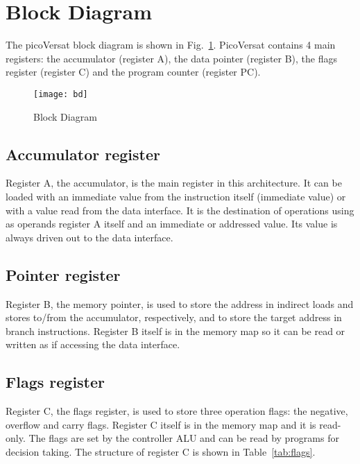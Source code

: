 \section{Block Diagram}

The picoVersat block diagram is shown in Fig.~\ref{fig:bd}. PicoVersat contains
4 main registers: the accumulator (register A), the data pointer (register B),
the flags register (register C) and the program counter (register PC).

\begin{figure}[!htbp]
    \centerline{\texttt{[image: bd]}}
    \vspace{0cm}\caption{Block Diagram}
    \label{fig:bd}
\end{figure}



\subsection{Accumulator register}

Register A, the accumulator, is the main register in this architecture. It can
be loaded with an immediate value from the instruction itself (immediate value)
or with a value read from the data interface. It is the destination of
operations using as operands register A itself and an immediate or addressed
value. Its value is always driven out to the data interface.

\subsection{Pointer register}

Register B, the memory pointer, is used to store the address in indirect loads
and stores to/from the accumulator, respectively, and to store the target
address in branch instructions. Register B itself is in the memory map so it can
be read or written as if accessing the data interface.

\subsection{Flags register}

Register C, the flags register, is used to store three operation flags: the
negative, overflow and carry flags. Register C itself is in the memory map and
it is read-only. The flags are set by the controller ALU and can be read by
programs for decision taking. The structure of register C is shown in
Table~\ref{tab:flags}.

